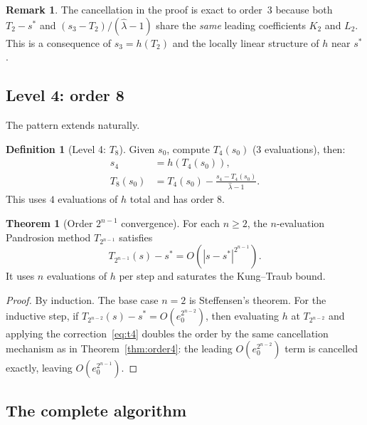 \documentclass[11pt,a4paper]{article}
\theoremstyle{definition}
\newtheorem{definition}{Definition}[section]
\newtheorem{theorem}{Theorem}[section]
\newtheorem{remark}{Remark}[section]
\begin{document}
\begin{remark}
The cancellation in the proof is exact to order~$3$ because both $T_2 - s^*$ and $(s_3 - T_2)/(\hat\lambda - 1)$ share the \emph{same} leading coefficients $K_2$ and $L_2$.  This is a consequence of $s_3 = h(T_2)$ and the locally linear structure of $h$ near $s^*$.
\end{remark}

\subsection{Level 4: order 8}

The pattern extends naturally.

\begin{definition}[Level 4: $T_8$]
\label{def:T8}
Given $s_0$, compute $T_4(s_0)$ (3 evaluations), then:
\begin{align}
  s_4 &= h(T_4(s_0)), \label{eq:t8_s4} \\
  T_8(s_0) &= T_4(s_0) - \frac{s_4 - T_4(s_0)}{\hat{\lambda} - 1}. \label{eq:t8}
\end{align}
This uses $4$ evaluations of $h$ total and has order $8$.
\end{definition}

\begin{theorem}[Order $2^{n-1}$ convergence]
\label{thm:general}
For each $n \geq 2$, the $n$-evaluation Pandrosion method $T_{2^{n-1}}$ satisfies
\[
  T_{2^{n-1}}(s) - s^* = O(|s - s^*|^{2^{n-1}}).
\]
It uses $n$ evaluations of $h$ per step and saturates the Kung--Traub bound.
\end{theorem}

\begin{proof}
By induction.  The base case $n=2$ is Steffensen's theorem.  For the inductive step, if $T_{2^{n-2}}(s) - s^* = O(e_0^{2^{n-2}})$, then evaluating $h$ at $T_{2^{n-2}}$ and applying the correction~\eqref{eq:t4} doubles the order by the same cancellation mechanism as in Theorem~\ref{thm:order4}: the leading $O(e_0^{2^{n-2}})$ term is cancelled exactly, leaving $O(e_0^{2^{n-1}})$.
\end{proof}

\subsection{The complete algorithm}
\end{document}
